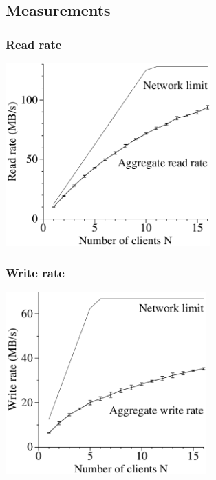 \documentclass{beamer}
\begin{document}
\subsection{Measurements}
\newcommand{\ratemesoption}{7cm}
\newcommand{\ratemehspace}{\hspace{15mm}}
\begin{frame}
 \frametitle{Read rate}
 \ratemehspace
 \includegraphics[height=\ratemesoption]{figures/GFSreads.png}
\end{frame}

\begin{frame}
 \frametitle{Write rate}
 \ratemehspace
 \includegraphics[height=\ratemesoption]{figures/GFSwrites.png}
\end{frame}
\end{document}

